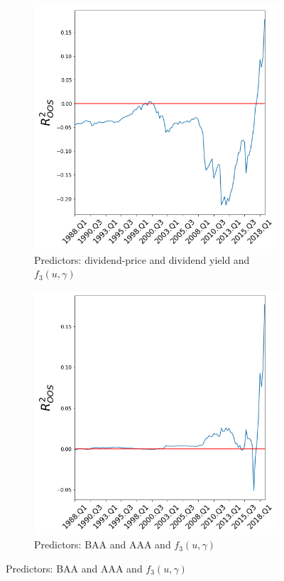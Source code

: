 \documentclass[a4paper,12pt,times,numbered,print,index]{report}
\numberwithin{equation}{section}
\begin{document}
\begin{figure}[H]
		\medskip
		\begin{subfigure}{0.48\textwidth}
			\captionsetup{justification=centering}
			\includegraphics[width=0.8\linewidth]{co3f3.png}
			\caption{Predictors: dividend-price and dividend yield and $f_{3}( u,\gamma)$ } \label{co3f3}
		\end{subfigure}\hspace*{\fill}
		\begin{subfigure}{0.48\textwidth}
			\captionsetup{justification=centering}
			\includegraphics[width=0.8\linewidth]{co4f3.png}
			\caption{Predictors: BAA and AAA and $f_{3}( u,\gamma)$ } \label{co4f3}
		\end{subfigure}
	\end{figure}
	
\end{document}
